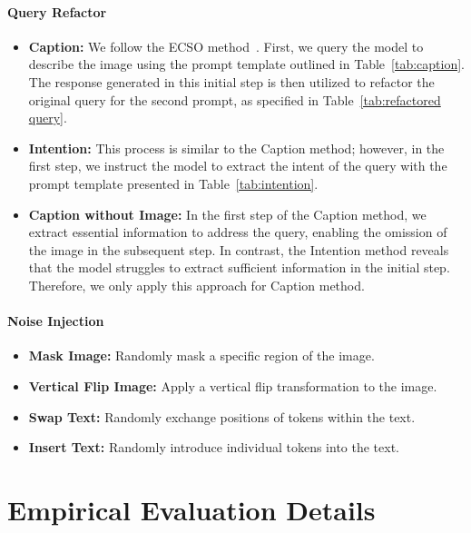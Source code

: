 \paragraph{Query Refactor}
\begin{itemize}
    \item \textbf{Caption:} We follow the ECSO method~\cite{gou2024eyes}. First, we query the model to describe the image using the prompt template outlined in Table~\ref{tab:caption}. The response generated in this initial step is then utilized to refactor the original query for the second prompt, as specified in Table~\ref{tab:refactored query}.

    \item \textbf{Intention:} This process is similar to the Caption method; however, in the first step, we instruct the model to extract the intent of the query with the prompt template presented in Table~\ref{tab:intention}.
    
    \item \textbf{Caption without Image:} In the first step of the Caption method, we extract essential information to address the query, enabling the omission of the image in the subsequent step. In contrast, the Intention method reveals that the model struggles to extract sufficient information in the initial step. Therefore, we only apply this approach for Caption method.
\end{itemize}

\paragraph{Noise Injection}
\begin{itemize}
    \item \textbf{Mask Image:} Randomly mask a specific region of the image.
    \item \textbf{Vertical Flip Image:} Apply a vertical flip transformation to the image.
    \item \textbf{Swap Text:} Randomly exchange positions of tokens within the text.
    \item \textbf{Insert Text:} Randomly introduce individual tokens into the text.
\end{itemize}



\section{Empirical Evaluation Details}
\label{sec:experiment_detail}

